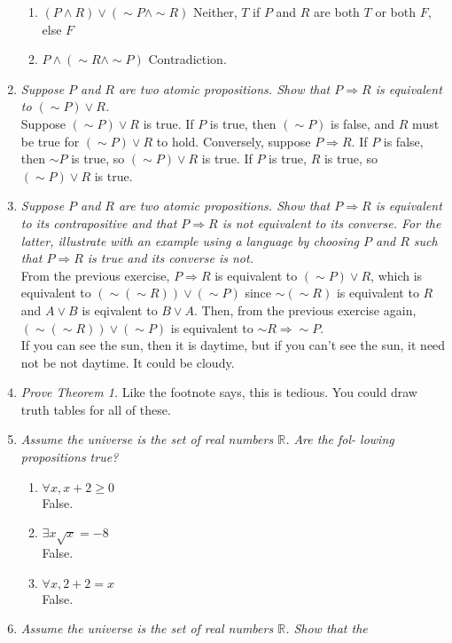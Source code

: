 \documentclass[10pt]{article}
\begin{document}
\begin{enumerate}
\begin{enumerate}
  \item $(P \wedge R) \vee (\sim P\wedge \sim R)$
    Neither, $T$ if $P$ and $R$ are both $T$ or both $F$, else $F$
  \item $P \wedge (\sim R \wedge \sim P)$
    Contradiction. 
  \end{enumerate}
\item \textit{Suppose $P$ and $R$ are two atomic propositions. Show that
    $P \Rightarrow R$ is equivalent to $(\sim P) \vee R$.} \\
  Suppose $(\sim P) \vee R$ is true. If $P$ is true, then $(\sim P)$
  is false, and $R$ must be true for $(\sim P) \vee R$ to
  hold. Conversely, suppose $P \Rightarrow R$. If $P$ is false, then
  $\sim P$ is true, so $(\sim P) \vee R$ is true. If $P$ is true, $R$
  is true, so $(\sim P) \vee R$ is true. 
\item \textit{Suppose $P$ and $R$ are two atomic propositions. Show that $P \Rightarrow
R$ is equivalent to its contrapositive and that $P \Rightarrow R$ is not equivalent to
its converse. For the latter, illustrate with an example using a language by
choosing $P$ and $R$ such that $P \Rightarrow R$ is true and its
converse is not.} \\
From the previous exercise, $P \Rightarrow R$ is equivalent to $(\sim
P) \vee R$, which is equivalent to $(\sim(\sim R)) \vee (\sim P)$
since $\sim (\sim R)$ is equivalent to $R$ and $A \vee B$ is eqivalent
to $B \vee A$. Then, from the previous exercise again, $(\sim(\sim R))
\vee (\sim P)$ is equivalent to $\sim R \Rightarrow \sim P$.  \\
If you can see the sun, then it is daytime, but if you can't see the
sun, it need not be not daytime. It could be cloudy.
\item \textit{Prove Theorem 1.}
  Like the footnote says, this is tedious. You could draw truth tables
  for all of these. 
\item \textit{Assume the universe is the set of real numbers $\mathbb{R}$. Are the fol-
    lowing propositions true?} 
  \begin{enumerate}
  \item $ \forall x, x + 2 ≥ 0$ \\
    False.
  \item $\exists x \sqrt{x} = −8$ \\
    False.
  \item $\forall x, 2 + 2 = x$\\
    False. 
  \end{enumerate}
\item \textit{Assume the universe is the set of real numbers $\mathbb{R}$. Show that the
}
\end{enumerate}
\end{document}
